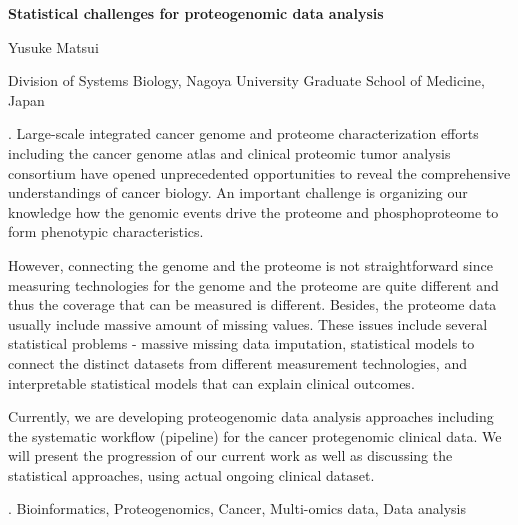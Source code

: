 \documentclass[12pt]{article}
\begin{document}
\begin{flushleft}


{\LARGE\bf Statistical challenges for proteogenomic data analysis}


\vspace{1.0cm}

Yusuke Matsui

\begin{description}

\item Division of Systems Biology, Nagoya University Graduate School of Medicine, Japan

\end{description}

\end{flushleft}


\vspace{0.75cm}

. Large-scale integrated cancer genome and proteome characterization efforts including the cancer genome atlas and clinical proteomic tumor analysis consortium have opened unprecedented opportunities to reveal the comprehensive understandings of cancer biology. An important challenge is organizing our knowledge how the genomic events drive the proteome and phosphoproteome to form phenotypic characteristics. 

However, connecting the genome and the proteome is not straightforward since measuring technologies for the genome and the proteome are quite different and thus the coverage that can be measured is different. Besides, the proteome data usually include massive amount of missing values. These issues include several statistical problems - massive missing data imputation, statistical models to connect the distinct datasets from different measurement technologies, and interpretable statistical models that can explain clinical outcomes.

Currently, we are developing proteogenomic data analysis approaches including the systematic workflow (pipeline) for the cancer protegenomic clinical data. We will present the progression of our current work as well as discussing the statistical approaches, using actual ongoing clinical dataset. 

\vskip 2mm

.
Bioinformatics, Proteogenomics, Cancer, Multi-omics data, Data analysis
\end{document}
